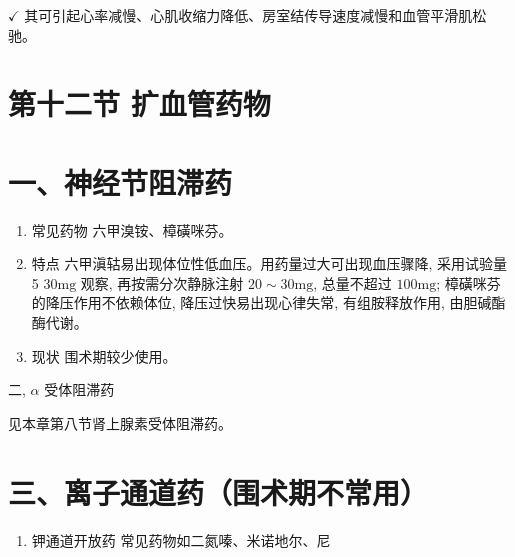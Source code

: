 \documentclass[10pt]{article}
\begin{document}
$\checkmark$ 其可引起心率减慢、心肌收缩力降低、房室结传导速度减慢和血管平滑肌松驰。

\section*{第十二节 扩血管药物}
\section*{一、神经节阻滞药}
\begin{enumerate}
  \item 常见药物 六甲溴铵、樟磺咪芬。

  \item 特点 六甲滇轱易出现体位性低血压。用药量过大可出现血压骤降, 采用试验量 5 $30 \mathrm{mg}$ 观察, 再按需分次静脉注射 $20 \sim 30 \mathrm{mg}$, 总量不超过 $100 \mathrm{mg}$; 樟磺咪芬的降压作用不依赖体位, 降压过快易出现心律失常, 有组胺释放作用, 由胆碱酯酶代谢。

  \item 现状 围术期较少使用。

\end{enumerate}

二, $\alpha$ 受体阻滞药

见本章第八节肾上腺素受体阻滞药。

\section*{三、离子通道药（围术期不常用）}
\begin{enumerate}
  \item 钾通道开放药 常见药物如二氮嗪、米诺地尔、尼
\end{enumerate}
\end{document}
